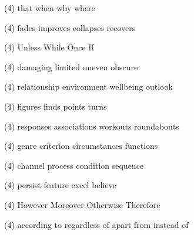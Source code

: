 \item
\begin{tasks}(4)
	\task that
	\task when
	\task why
	\task where
\end{tasks}
\item
\begin{tasks}(4)
	\task fades
	\task improves
	\task collapses
	\task recovers
\end{tasks}
\item
\begin{tasks}(4)
	\task Unless
	\task While
	\task Once
	\task If
\end{tasks}
\item
\begin{tasks}(4)
	\task damaging
	\task limited
	\task uneven
	\task obscure
\end{tasks}
\item
\begin{tasks}(4)
	\task relationship
	\task environment
	\task wellbeing
	\task outlook
\end{tasks}
\item
\begin{tasks}(4)
	\task figures
	\task finds
	\task points
	\task turns
\end{tasks}
\item
\begin{tasks}(4)
	\task responses
	\task associations
	\task workouts
	\task roundabouts
\end{tasks}
\item
\begin{tasks}(4)
	\task genre
	\task criterion
	\task circumstances
	\task functions
\end{tasks}
\item
\begin{tasks}(4)
	\task channel
	\task process
	\task condition
	\task sequence
\end{tasks}
\item
\begin{tasks}(4)
	\task persist
	\task feature
	\task excel
	\task believe
\end{tasks}
\item
\begin{tasks}(4)
	\task However
	\task Moreover
	\task Otherwise
	\task Therefore
\end{tasks}
\item
\begin{tasks}(4)
	\task according to
	\task regardless of
	\task apart from
	\task instead of
\end{tasks}
